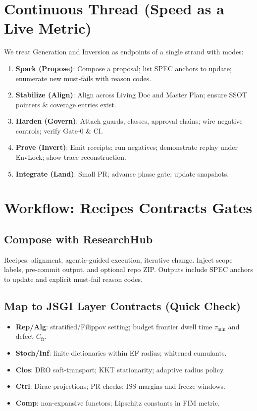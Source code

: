 \documentclass[11pt]{article}
\begin{document}
\section{Continuous Thread (Speed as a Live Metric)}
We treat Generation and Inversion as endpoints of a single strand with modes:
\begin{enumerate}
  \item \textbf{Spark (Propose)}: Compose a proposal; list SPEC anchors to update; enumerate new must-fails with reason codes.
  \item \textbf{Stabilize (Align)}: Align across Living Doc and Master Plan; ensure SSOT pointers \& coverage entries exist.
  \item \textbf{Harden (Govern)}: Attach guards, classes, approval chains; wire negative controls; verify Gate-0 \& CI.
  \item \textbf{Prove (Invert)}: Emit receipts; run negatives; demonstrate replay under EnvLock; show trace reconstruction.
  \item \textbf{Integrate (Land)}: Small PR; advance phase gate; update snapshots.
\end{enumerate}

\section{Workflow: Recipes \textrightarrow{} Contracts \textrightarrow{} Gates}
\subsection{Compose with ResearchHub}
Recipes: alignment, agentic-guided execution, iterative change. Inject scope labels, pre-commit output, and optional repo ZIP. Outputs include SPEC anchors to update and explicit must-fail reason codes.

\subsection{Map to JSGI Layer Contracts (Quick Check)}
\begin{itemize}
  \item \textbf{Rep/Alg}: stratified/Filippov setting; budget frontier dwell time $\tau_{\min}$ and defect $C_{\mathrm{fr}}$.
  \item \textbf{Stoch/Inf}: finite dictionaries within EF radius; whitened cumulants.
  \item \textbf{Clos}: DRO soft-transport; KKT stationarity; adaptive radius policy.
  \item \textbf{Ctrl}: Dirac projections; PR checks; ISS margins and freeze windows.
  \item \textbf{Comp}: non-expansive functors; Lipschitz constants in FIM metric.
\end{itemize}
\end{document}

